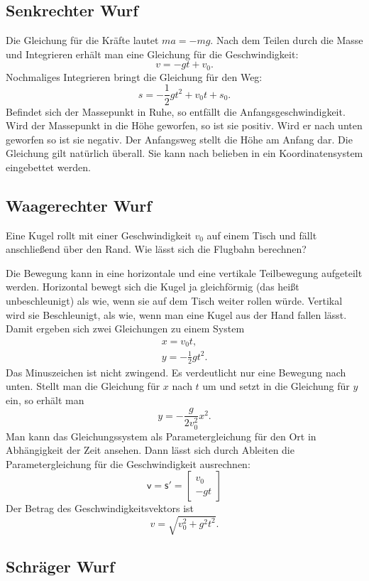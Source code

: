 \documentclass[a4paper,11pt,fleqn,twocolumn,twoside,dvipdfmx]{scrartcl}
\newcommand{\bvec}[1]{\bm{\mathsf{#1}}}
\begin{document}
\subsection{Senkrechter Wurf}

Die Gleichung für die Kräfte lautet $ma=-mg$. Nach dem Teilen durch
die Masse und Integrieren erhält man eine Gleichung für die
Geschwindigkeit:%
\[v = -gt + v_0.\]
Nochmaliges Integrieren bringt die Gleichung für den Weg:%
\[s = -\frac{1}{2}gt^2 + {v_0}t + s_0.\]
Befindet sich der Massepunkt in Ruhe, so entfällt die
Anfangsgeschwindigkeit. Wird der Massepunkt in die Höhe geworfen,
so ist sie positiv. Wird er nach unten geworfen so ist sie negativ.
Der Anfangsweg stellt die Höhe am Anfang dar. Die Gleichung gilt
natürlich überall. Sie kann nach belieben in ein Koordinatensystem
eingebettet werden.

\subsection{Waagerechter Wurf}

Eine Kugel rollt mit einer Geschwindigkeit $v_0$ auf einem Tisch
und fällt anschließend über den Rand. Wie lässt sich die Flugbahn
berechnen?

Die Bewegung kann in eine horizontale und eine vertikale Teilbewegung
aufgeteilt werden. Horizontal bewegt sich die Kugel ja gleichförmig
(das heißt unbeschleunigt) als wie, wenn sie auf dem Tisch weiter
rollen würde. Vertikal wird sie Beschleunigt, als wie, wenn man eine
Kugel aus der Hand fallen lässt. Damit ergeben sich zwei Gleichungen
zu einem System%
\begin{gather*}
x = {v_0}t,\\
y = -\frac{1}{2}gt^2.
\end{gather*}
Das Minuszeichen ist nicht zwingend. Es verdeutlicht nur eine
Bewegung nach unten. Stellt man die Gleichung für $x$ nach $t$
um und setzt in die Gleichung für $y$ ein, so erhält man%
\[y = -\frac{g}{2v_0^2} x^2.\]
Man kann das Gleichungssystem als Parameter{}gleichung für den Ort
in Abhängigkeit der Zeit ansehen. Dann lässt sich durch Ableiten
die Parameter{}gleichung für die Geschwindigkeit ausrechnen:%
\[\bvec v = \bvec s'
= \begin{bmatrix}v_0\\ -gt
\end{bmatrix}\]
Der Betrag des Geschwindigkeitsvektors ist%
\[v = \sqrt{v_0^2 + g^2t^2}.\]

\subsection{Schräger Wurf}
\end{document}
